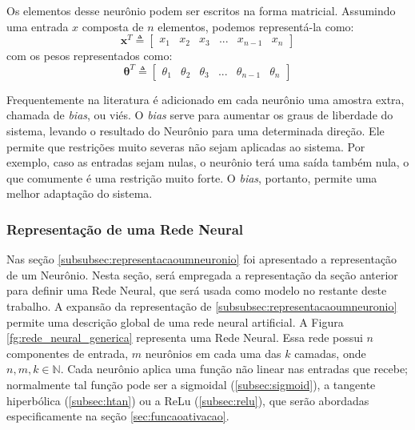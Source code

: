 Os elementos desse neurônio podem ser escritos na forma matricial. Assumindo uma entrada $x$ composta de $n$ elementos, podemos representá-la como:
\begin{equation}
  \mathbf{x}^T \triangleq \begin{bmatrix}x_{1}&x_{2}&x_{3}&...&x_{n-1}&x_{n} \end{bmatrix}
\end{equation}
 com os pesos representados como:
 \begin{equation}
  \mathbf{\theta}^T \triangleq \begin{bmatrix}\theta_{1}&\theta_{2}&\theta_{3}&...&\theta_{n-1}&\theta_{n}\end{bmatrix}
\end{equation}

Frequentemente na literatura \cite{haykin2004comprehensive, haykin2009neural, lecun2015deep} é adicionado em cada neurônio uma amostra extra, chamada de \textit{bias}, ou viés. O \textit{bias} serve para aumentar os graus de liberdade do sistema, levando o resultado do Neurônio para uma determinada direção. Ele permite que restrições muito severas não sejam aplicadas ao sistema. Por exemplo, caso as entradas sejam nulas, o neurônio terá uma saída também nula, o que comumente é uma restrição muito forte. O  \textit{bias}, portanto,  permite uma melhor adaptação do sistema.


\subsubsection{Representação de uma Rede Neural}
\label{subsubsec:representacaoumaredeneural}
Nas seção \ref{subsubsec:representacaoumneuronio} foi apresentado a representação de um Neurônio. Nesta seção, será empregada a representação da seção anterior para definir uma Rede Neural, que será usada como modelo no restante deste trabalho. A expansão da representação de \ref{subsubsec:representacaoumneuronio} permite uma descrição global de uma rede neural artificial. A Figura \ref{fg:rede_neural_generica} representa uma Rede Neural. Essa rede possui $n$ componentes de entrada, $m$ neurônios em cada uma das $k$ camadas, onde $n, m, k\in \mathbb{N}$. Cada neurônio aplica uma função não linear nas entradas que recebe; normalmente tal função pode ser a sigmoidal (\ref{subsec:sigmoid}), a tangente hiperbólica (\ref{subsec:htan}) ou a ReLu (\ref{subsec:relu}), que serão abordadas especificamente na seção \ref{sec:funcaoativacao}.

